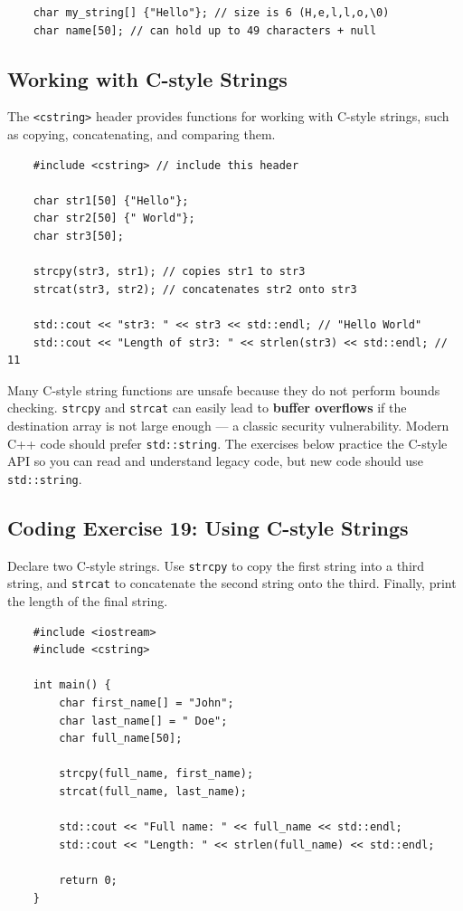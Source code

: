 \begin{lstlisting}
	char my_string[] {"Hello"}; // size is 6 (H,e,l,l,o,\0)
	char name[50]; // can hold up to 49 characters + null
\end{lstlisting}

\subsection{Working with C-style Strings}
The \texttt{<cstring>} header provides functions for working with C-style strings, such as copying, concatenating, and comparing them.

\begin{lstlisting}
	#include <cstring> // include this header

	char str1[50] {"Hello"};
	char str2[50] {" World"};
	char str3[50];

	strcpy(str3, str1); // copies str1 to str3
	strcat(str3, str2); // concatenates str2 onto str3

	std::cout << "str3: " << str3 << std::endl; // "Hello World"
	std::cout << "Length of str3: " << strlen(str3) << std::endl; // 11
\end{lstlisting}

\begin{remark}
	Many C-style string functions are unsafe because they do not perform bounds checking. \texttt{strcpy} and \texttt{strcat} can easily lead to \textbf{buffer overflows} if the destination array is not large enough — a classic security vulnerability. Modern C++ code should prefer \texttt{std::string}. The exercises below practice the C-style API so you can read and understand legacy code, but new code should use \texttt{std::string}.
\end{remark}

\subsection{Coding Exercise 19: Using C-style Strings}
Declare two C-style strings. Use \texttt{strcpy} to copy the first string into a third string, and \texttt{strcat} to concatenate the second string onto the third. Finally, print the length of the final string.
\begin{lstlisting}
	#include <iostream>
	#include <cstring>

	int main() {
		char first_name[] = "John";
		char last_name[] = " Doe";
		char full_name[50];

		strcpy(full_name, first_name);
		strcat(full_name, last_name);

		std::cout << "Full name: " << full_name << std::endl;
		std::cout << "Length: " << strlen(full_name) << std::endl;

		return 0;
	}
\end{lstlisting}

